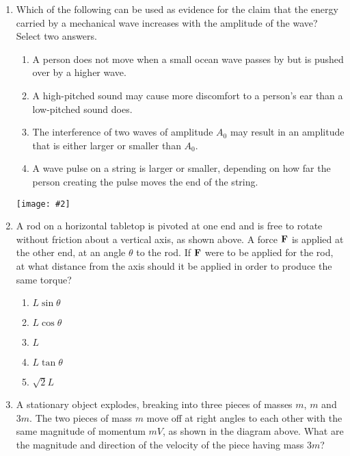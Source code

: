 \documentclass[11pt]{article}
\newcommand{\pic}[2]{\texttt{[image: \#2]}}
\newcommand{\mb}[1]{\ensuremath\mathbf{#1}}
\begin{document}
\begin{multicols}{2}
\begin{enumerate}[leftmargin=18pt,resume]
  \item Which of the following can be used as evidence for the claim that the
    energy carried by a mechanical wave increases with the amplitude of the
    wave? Select two answers.
    \begin{enumerate}[noitemsep,topsep=0pt,leftmargin=18pt,label=(\Alph*)]
    \item A person does not move when a small ocean wave passes by but is pushed
      over by a higher wave.
    \item A high-pitched sound may cause more discomfort to a person's ear than
      a low-pitched sound does.
    \item The interference of two waves of amplitude $A_0$ may result in an
      amplitude that is either larger or smaller than $A_0$.
    \item A wave pulse on a string is larger or smaller, depending on how far
      the person creating the pulse moves the end of the string.
    \end{enumerate}
    \vspace{.7in}
    
    \begin{center}
      \pic{.4}{rod}
    \end{center}
  \item A rod on a horizontal tabletop is pivoted at one end and is free to
    rotate without friction about a vertical axis, as shown above. A force
    $\mb{F}$ is applied at the other end, at an angle $\theta$ to the rod. If
    $\mb{F}$ were to be applied for the rod, at what distance from the axis
    should it be applied in order to produce the same torque?
    \begin{enumerate}[noitemsep,topsep=0pt,leftmargin=18pt,label=(\Alph*)]
    \item$L\sin\theta$
    \item$L\cos\theta$
    \item$L$
    \item$L\tan\theta$
    \item$\sqrt{2}L$
    \end{enumerate}
    \columnbreak
    
    \begin{center}
    \end{center}
  \item A stationary object explodes, breaking into three pieces of masses $m$,
    $m$ and $3m$. The two pieces of mass $m$ move off at right angles to each
    other with the same magnitude of momentum $mV$, as shown in the diagram
    above. What are the magnitude and direction of the velocity of the piece
    having mass $3m$?


\end{enumerate}
\end{multicols}
\end{document}
